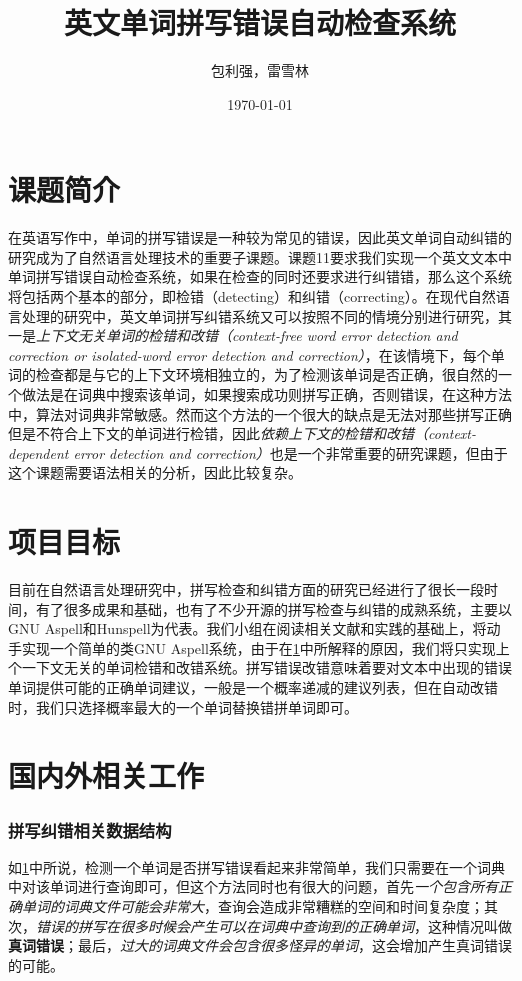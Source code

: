 \documentclass[UTF8,a4paper]{ctexart}
\title{英文单词拼写错误自动检查系统}
\author{包利强，雷雪林}
\date{\today}
\begin{document}
\maketitle
\tableofcontents

\clearpage
\section{课题简介}
\label{intro}
在英语写作中，单词的拼写错误是一种较为常见的错误，因此英文单词自动纠错的研究成为了自然语言处理技术的重要子课题。课题11要求我们实现一个英文文本中单词拼写错误自动检查系统，如果在检查的同时还要求进行纠错错，那么这个系统将包括两个基本的部分，即检错（detecting）和纠错（correcting）。在现代自然语言处理的研究中，英文单词拼写纠错系统又可以按照不同的情境分别进行研究，其一是\textit{上下文无关单词的检错和改错（context-free word error detection and correction or isolated-word error detection and correction）}，在该情境下，每个单词的检查都是与它的上下文环境相独立的，为了检测该单词是否正确，很自然的一个做法是在词典中搜索该单词，如果搜索成功则拼写正确，否则错误，在这种方法中，算法对词典非常敏感。然而这个方法的一个很大的缺点是无法对那些拼写正确但是不符合上下文的单词进行检错，因此\textit{依赖上下文的检错和改错（context-dependent error detection and correction）}也是一个非常重要的研究课题，但由于这个课题需要语法相关的分析，因此比较复杂\cite{deorowicz2005correcting}。

\section{项目目标}
\label{target}
目前在自然语言处理研究中，拼写检查和纠错方面的研究已经进行了很长一段时间，有了很多成果和基础，也有了不少开源的拼写检查与纠错的成熟系统，主要以GNU Aspell和Hunspell为代表。我们小组在阅读相关文献和实践的基础上，将动手实现一个简单的类GNU Aspell系统，由于在\ref{intro}中所解释的原因，我们将只实现上个一下文无关的单词检错和改错系统。拼写错误改错意味着要对文本中出现的错误单词提供可能的正确单词建议，一般是一个概率递减的建议列表，但在自动改错时，我们只选择概率最大的一个单词替换错拼单词即可。

\section{国内外相关工作}
\label{related}

\subsubsection{拼写纠错相关数据结构}
如\ref{intro}中所说，检测一个单词是否拼写错误看起来非常简单，我们只需要在一个词典中对该单词进行查询即可，但这个方法同时也有很大的问题，首先\textit{一个包含所有正确单词的词典文件可能会非常大}，查询会造成非常糟糕的空间和时间复杂度；其次，\textit{错误的拼写在很多时候会产生可以在词典中查询到的正确单词}，这种情况叫做\textbf{真词错误}；最后，\textit{过大的词典文件会包含很多怪异的单词}，这会增加产生真词错误的可能。
\end{document}
